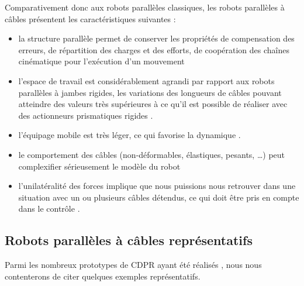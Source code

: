 Comparativement donc aux robots parallèles classiques, les robots parallèles à 
câbles présentent les caractéristiques suivantes :
\begin{itemize}
 \item la structure parallèle permet de conserver les propriétés de 
compensation des erreurs, de répartition des charges et des efforts, de coopération des 
chaînes cinématique pour l'exécution d'un mouvement
 \item l'espace de travail est considérablement agrandi par rapport aux robots 
parallèles à jambes rigides, les variations des longueurs de câbles pouvant 
atteindre des valeurs très supérieures à ce qu'il est possible de réaliser 
avec des actionneurs prismatiques rigides \cite{riehl2010}.
 \item l'équipage mobile est très léger, ce qui favorise la dynamique 
\cite{kawamura1995}.
 \item le comportement des câbles (non-déformables, élastiques, pesants, \dots) 
peut complexifier s\'erieusement le modèle du robot \cite{riehl2009} 
\cite{merlet2004interferences} \cite{lolo2014}
 \item l'unilatéralité des forces implique que nous puissions nous retrouver 
dans une situation avec un ou plusieurs câbles détendus, ce qui doit être pris 
en compte dans le contrôle \cite{merlet2013openissues}.
\end{itemize}


\subsection{Robots parall\`eles à c\^ables repr\'esentatifs} \label{chap0-1-0}

Parmi les nombreux prototypes de CDPR ayant \'et\'e r\'ealis\'es 
\cite{kawamura1995}\cite{}\cite{}, nous nous contenterons de citer quelques 
exemples repr\'esentatifs.\\

